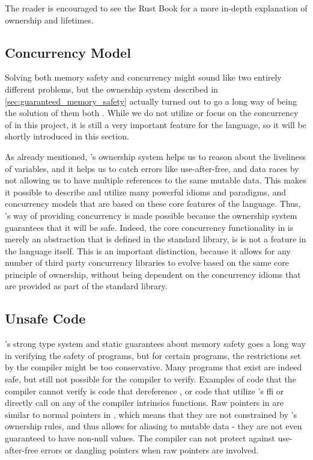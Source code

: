 The reader is encouraged to see the Rust Book \cite{web:rust_book} for a more in-depth explanation of ownership and lifetimes.

\subsection{Concurrency Model} %
\label{ssub:concurrency_model}

Solving both memory safety and concurrency might sound like two entirely different problems, but the ownership system described in \autoref{sec:guaranteed_memory_safety} actually turned out to go a long way of being the solution of them both \cite{web:fearless_concurrency_with_rust}.
While we do not utilize or focus on the concurrency of {\rust} in this project, it is still a very important feature for the language, so it will be shortly introduced in this section.

As already mentioned, {\rust}'s ownership system helps us to reason about the liveliness of variables, and it helps us to catch errors like use-after-free, and data races by not allowing us to have multiple references to the same mutable data.
This makes it possible to describe and utilize many powerful idioms and paradigms, and concurrency models that are based on these core features of the language.
Thus, {\rust}'s way of providing concurrency is made possible because the ownership system guarantees that it will be safe.
Indeed, the core concurrency functionality in {\rust} is merely an abstraction that is defined in the standard library, is is not a feature in the language itself.
This is an important distinction, because it allows for any number of third party concurrency libraries to evolve based on the same core principle of ownership, without being dependent on the concurrency idioms that are provided as part of the standard library.

\subsection{Unsafe Code} %
\label{ssub:unsafe_code}

{\rust}'s strong type system and static guarantees about memory safety goes a long way in verifying the safety of programs, but for certain programs, the restrictions set by the compiler might be too conservative.
Many programs that exist are indeed safe, but still not possible for the compiler to verify.
Examples of code that the compiler cannot verify is code that dereference , or code that utilize {\rust}'s \gls{ffi} or directly call on any of the compiler intrinsics functions.
Raw pointers in {\rust} are similar to normal pointers in {\C}, which means that they are not constrained by {\rust}'s ownership rules, and thus allows for aliasing to mutable data - they are not even guaranteed to have non-null values.
The compiler can not protect against use-after-free errors or dangling pointers when raw pointers are involved.

